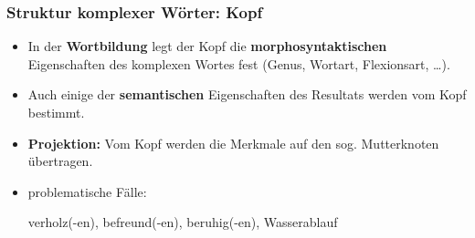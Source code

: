 \begin{frame}
\frametitle{Struktur komplexer Wörter: Kopf}

\begin{minipage}{.7\textwidth}


\begin{itemize}
	\item In der \textbf{Wortbildung} legt der Kopf die \textbf{morphosyntaktischen} Eigenschaften des komplexen Wortes fest (\zB Genus, Wortart, Flexionsart, \ldots ). 

\medskip
 	
	\item Auch einige der \textbf{semantischen} Eigenschaften des Resultats werden vom Kopf bestimmt.

\medskip
	
	\item \textbf{Projektion:} Vom Kopf werden die Merkmale auf den sog. Mutterknoten übertragen.  

\medskip
	
	\item problematische Fälle:
		
		\ea verholz(-en), befreund(-en), beruhig(-en), Wasserablauf
		\z
		
\end{itemize}



\end{minipage}
%
\hfill%
%
\begin{minipage}{.29\textwidth}

\begin{figure}	
	\centering


\end{figure}
\end{minipage}
\end{frame}
